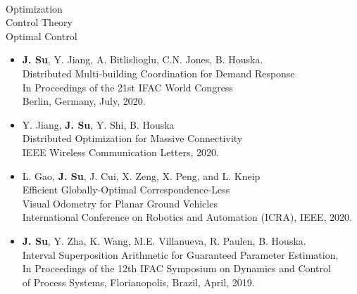 \documentclass[margin]{res}
\begin{document}
\begin{resume}
{} 

    {
        \\Optimization
        \\Control Theory  
        \\Optimal Control  
    }
    
    {
    \begin{itemize}
        

         \item
        \textbf{J. Su}, Y. Jiang, A. Bitlislioglu, C.N. Jones, B. Houska. 
        \\Distributed Multi-building Coordination for Demand Response 
        \\ In Proceedings of the 21st IFAC World Congress 
        \\ Berlin, Germany, July, 2020. 


        \item
        Y. Jiang, \textbf{J. Su}, Y. Shi, B. Houska
        \\Distributed Optimization for Massive Connectivity
        \\ IEEE Wireless Communication Letters, 2020. 

        \item L. Gao, \textbf{J. Su}, J. Cui, X. Zeng, X. Peng, and L. Kneip
        \\ Efficient Globally-Optimal Correspondence-Less 
        \\ Visual Odometry for Planar Ground Vehicles  
        \\ International Conference on Robotics and Automation (ICRA), IEEE, 2020. 

        \item
        \textbf{J. Su}, Y. Zha, K. Wang, M.E. Villanueva, R. Paulen, B. Houska. 
        \\Interval Superposition Arithmetic for Guaranteed Parameter Estimation,
        \\In Proceedings of the 12th IFAC Symposium on Dynamics and Control 
        \\of Process Systems, Florianopolis, Brazil, April, 2019.


\end{itemize}}
\end{resume}
\end{document}
